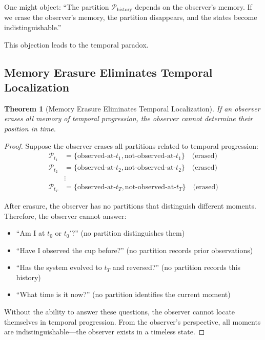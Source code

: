 \documentclass[twocolumn,10pt]{article}
\newtheorem{theorem}{Theorem}[section]
\theoremstyle{definition}
\theoremstyle{remark}
\begin{document}
\vspace{0.2cm}
\noindent One might object: ``The partition $\mathcal{P}_{\text{history}}$ depends on the observer's memory. If we erase the observer's memory, the partition disappears, and the states become indistinguishable.''

\vspace{0.2cm}
\noindent This objection leads to the temporal paradox.

\subsection{Memory Erasure Eliminates Temporal Localization}

\begin{theorem}[Memory Erasure Eliminates Temporal Localization]
\label{thm:memory_erasure}
If an observer erases all memory of temporal progression, the observer cannot determine their position in time.
\end{theorem}

\begin{proof}
Suppose the observer erases all partitions related to temporal progression:
\begin{align}
\mathcal{P}_{t_1} &= \{\text{observed-at-}t_1, \text{not-observed-at-}t_1\} \quad \text{(erased)} \\
\mathcal{P}_{t_2} &= \{\text{observed-at-}t_2, \text{not-observed-at-}t_2\} \quad \text{(erased)} \\
&\vdots \\
\mathcal{P}_{t_T} &= \{\text{observed-at-}t_T, \text{not-observed-at-}t_T\} \quad \text{(erased)}
\end{align}

After erasure, the observer has no partitions that distinguish different moments. Therefore, the observer cannot answer:
\begin{itemize}
\item ``Am I at $t_0$ or $t_0'$?'' (no partition distinguishes them)
\item ``Have I observed the cup before?'' (no partition records prior observations)
\item ``Has the system evolved to $t_T$ and reversed?'' (no partition records this history)
\item ``What time is it now?'' (no partition identifies the current moment)
\end{itemize}

Without the ability to answer these questions, the observer cannot locate themselves in temporal progression. From the observer's perspective, all moments are indistinguishable—the observer exists in a timeless state.
\end{proof}
\end{document}
